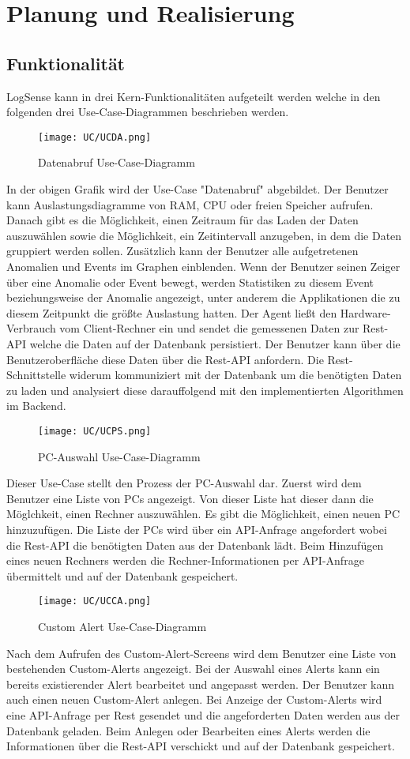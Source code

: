 \documentclass{report}
\begin{document}
\chapter{Planung und Realisierung}
\section{Funktionalität}
LogSense kann in drei Kern-Funktionalitäten aufgeteilt werden welche in den folgenden drei Use-Case-Diagrammen beschrieben werden. 
\begin{figure}[H]
    \centering
    \texttt{[image: UC/UCDA.png]}
    \caption{Datenabruf Use-Case-Diagramm}
\end{figure}
In der obigen Grafik wird der Use-Case "Datenabruf" abgebildet. Der Benutzer kann Auslastungsdiagramme von RAM, CPU oder freien Speicher aufrufen. Danach gibt es die Möglichkeit, einen Zeitraum für das Laden der Daten auszuwählen sowie die Möglichkeit, ein Zeitintervall anzugeben, in dem die Daten gruppiert werden sollen. Zusätzlich kann der Benutzer alle aufgetretenen Anomalien und Events im Graphen einblenden. Wenn der Benutzer seinen Zeiger über eine Anomalie oder Event bewegt, werden Statistiken zu diesem Event beziehungsweise der Anomalie angezeigt, unter anderem die Applikationen die zu diesem Zeitpunkt die größte Auslastung hatten. Der Agent ließt den Hardware-Verbrauch vom Client-Rechner ein und sendet die gemessenen Daten zur Rest-API welche die Daten auf der Datenbank persistiert. Der Benutzer kann über die Benutzeroberfläche diese Daten über die Rest-API anfordern. Die Rest-Schnittstelle widerum kommuniziert mit der Datenbank um die benötigten Daten zu laden und analysiert diese darauffolgend mit den implementierten Algorithmen im Backend. 
\begin{figure}[H]
    \centering
    \texttt{[image: UC/UCPS.png]}
    \caption{PC-Auswahl Use-Case-Diagramm}
\end{figure}
Dieser Use-Case stellt den Prozess der PC-Auswahl dar. Zuerst wird dem Benutzer eine Liste von PCs angezeigt. Von dieser Liste hat dieser dann die Möglchkeit, einen Rechner auszuwählen. Es gibt die Möglichkeit, einen neuen PC hinzuzufügen. Die Liste der PCs wird über ein API-Anfrage angefordert wobei die Rest-API die benötigten Daten aus der Datenbank lädt. Beim Hinzufügen eines neuen Rechners werden die Rechner-Informationen per API-Anfrage übermittelt und auf der Datenbank gespeichert.
\begin{figure}[H]
    \centering
    \texttt{[image: UC/UCCA.png]}
    \caption{Custom Alert Use-Case-Diagramm}
\end{figure}
Nach dem Aufrufen des Custom-Alert-Screens wird dem Benutzer eine Liste von bestehenden Custom-Alerts angezeigt. Bei der Auswahl eines Alerts kann ein bereits existierender Alert bearbeitet und angepasst werden. Der Benutzer kann auch einen neuen Custom-Alert anlegen. Bei Anzeige der Custom-Alerts wird eine API-Anfrage per Rest gesendet und die angeforderten Daten werden aus der Datenbank geladen. Beim Anlegen oder Bearbeiten eines Alerts werden die Informationen über die Rest-API verschickt und auf der Datenbank gespeichert. 
\end{document}
